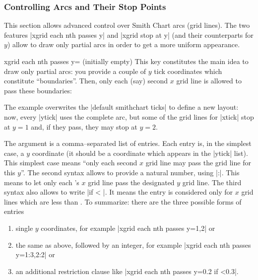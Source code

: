 \subsubsection{Controlling Arcs and Their Stop Points}
This section allows advanced control over Smith Chart arcs (grid lines). The two features |xgrid each nth passes y| and |xgrid stop at y| (and their counterparts for $y$) allow to draw only partial arcs in order to get a more uniform appearance.

\begin{pgfplotskey}{xgrid each nth passes y= (initially empty)}
	This key constitutes the main idea to draw only partial arcs: you provide a couple of $y$ tick coordinates which constitute ``boundaries''. Then, only each (say) second $x$ grid line is allowed to pass these boundaries:
\begin{codeexample}[]
\begin{tikzpicture}
	\begin{smithchart}[
		xtick={0.2,0.5,1,2,5},
		ytick={
			0,
			 0.2, 0.5, 1, 2, 5,
			-0.2,-0.5,-1,-2,-5},
		xgrid each nth passes y={1,2},
	]
	\end{smithchart}
\end{tikzpicture}
\end{codeexample}
	The example overwrites the |default smithchart ticks| to define a new layout: now, every |ytick| uses the complete arc, but some of the grid lines for |xtick| stop at $y=1$ and, if they pass, they may stop at $y=2$.

	The argument  is a comma--separated list of entries. Each entry is, in the simplest case, a $y$ coordinate (it should be a coordinate which appears in the |ytick| list). This simplest case means ``only each second $x$ grid line may pass the grid line for this $y$''. The second syntax allows to provide a natural number, using |:|. This means to let only each 's $x$ grid line pass the designated $y$ grid line. The third syntax also allows to write |if < |. It means the entry is considered only for $x$ grid lines which are less than . To summarize: there are the three possible forms of entries
	\begin{enumerate}
		\item single $y$ coordinates, for example |xgrid each nth passes y={1,2}| or
		\item the same as above, followed by an integer, for example |xgrid each nth passes y={1:3,2:2}| or
		\item an additional restriction clause like |xgrid each nth passes y={0.2 if <0.3}|. 
		

\end{enumerate}
\end{pgfplotskey}
